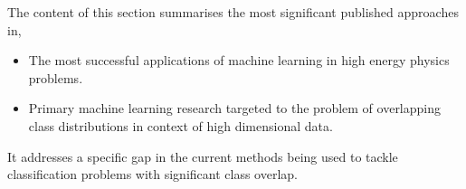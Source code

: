 

The content of this section summarises the most significant published approaches in, 

\begin{itemize}
\item The most successful applications of machine learning in high energy physics problems. 
\item Primary machine learning research targeted to the problem of overlapping class distributions in context of high dimensional data. 
\end{itemize}

It addresses a specific gap in the current methods being used to tackle classification problems with significant class overlap. 